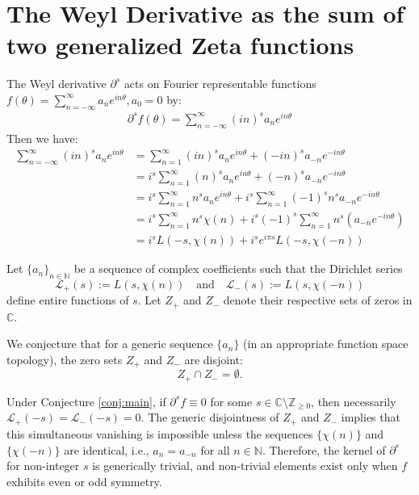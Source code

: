 \documentclass{artjlt}
\newcommand{\?}{\textbackslash}
\begin{document}
\section{The Weyl Derivative as the sum of two generalized Zeta functions}
The Weyl derivative $\partial^s$ \cite{article} acts on Fourier representable functions 
$f(\theta)= \sum_{n=-\infty}^\infty a_n e^{i n \theta}, a_0 = 0$ by:
\begin{align*}
  \partial^s f(\theta)= \sum_{n=-\infty}^\infty (in)^s a_n e^{i n \theta}
\end{align*}
Then we have:
\begin{align*}
  \sum_{n=-\infty}^\infty (in)^s a_n e^{i n \theta} &= \sum_{n=1}^\infty (in)^s a_n e^{i n \theta} + (-in)^s a_{-n} e^{-i n \theta} \\
  &= i^s \sum_{n=1}^\infty (n)^s a_n e^{i n \theta} + (-n)^s a_{-n} e^{-i n \theta} \\
&= i^s \sum_{n=1}^\infty n^s a_n e^{in\theta} + i^s \sum_{n=1}^\infty (-1)^s n^s a_{-n} e^{-in \theta} \\
&= i^s \sum_{n=1}^\infty n^s \chi(n) + i^s (-1)^s \sum_{n=1}^\infty n^s (a_{-n} e^{-in\theta}) \\
&= i^s L(-s, \chi(n)) + i^s e^{i \pi s} L(-s, \chi(-n))
\end{align*}
\begin{conjecture}
\label{conj:main}
Let \( \{a_n\}_{n \in \mathbb{N}} \) be a sequence of complex coefficients such that the Dirichlet series
\[
\mathcal{L}_+(s) := L(s, \chi(n)) \quad \text{and} \quad \mathcal{L}_-(s) := L(s, \chi(-n))
\]
define entire functions of \( s \). Let \( Z_+ \) and \( Z_- \) denote their respective sets of zeros in \( \mathbb{C} \).

We conjecture that for a generic sequence \( \{a_n\} \) (in an appropriate function space topology), the zero sets \( Z_+ \) and \( Z_- \) are disjoint:
\[
Z_+ \cap Z_- = \emptyset.
\]
\end{conjecture}

\begin{corollary}
Under Conjecture \ref{conj:main}, if \( \partial^s f \equiv 0 \) for some \( s \in \mathbb{C} \setminus \mathbb{Z}_{\ge 0} \), then necessarily \( \mathcal{L}_+(-s) = \mathcal{L}_-(-s) = 0 \). The generic disjointness of \( Z_+ \) and \( Z_- \) implies that this simultaneous vanishing is impossible unless the sequences \( \{\chi(n)\} \) and \( \{\chi(-n)\} \) are identical, i.e., \( a_n = a_{-n} \) for all \( n \in \mathbb{N} \). Therefore, the kernel of \( \partial^s \) for non-integer \( s \) is generically trivial, and non-trivial elements exist only when \( f \) exhibits even or odd symmetry.
\end{corollary}
\end{document}
